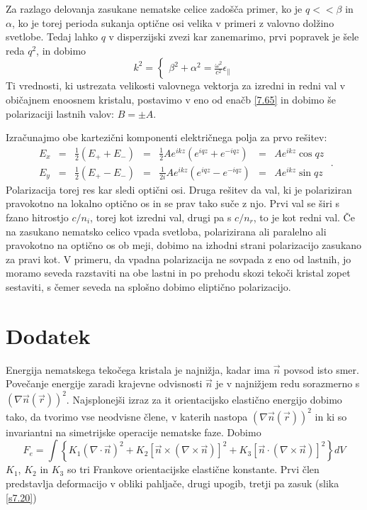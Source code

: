 \documentclass[11pt,fleqn]{book} %
\begin{document}
Za razlago delovanja zasukane nematske celice zadošča primer, ko je
$q<<\beta$ in $\alpha$, ko je torej perioda sukanja optične osi
velika v primeri z valovno dolžino svetlobe. Tedaj lahko $q$ v disperzijski
zvezi kar zanemarimo, prvi popravek je šele reda $q^{2}$, in dobimo
\begin{equation}
k^{2}=\left\{ \begin{matrix}\beta^{2}+\alpha^{2}=\frac{\omega^{2}}{c^{2}}\epsilon_{\parallel}\end{matrix}\right.\label{7.67}
\end{equation}
 Ti vrednosti, ki ustrezata velikosti valovnega vektorja za izredni
in redni val v običajnem enoosnem kristalu, postavimo v eno od enačb
\ref{7.65} in dobimo še polarizaciji lastnih valov: $B=\pm A$.

Izračunajmo obe kartezični komponenti električnega polja za prvo rešitev:
\begin{equation}
\begin{array}{lclclcl}
E_{x} & = & \frac{1}{2}(E_{+}+E_{-}) & = & \frac{1}{2}Ae^{ikz}(e^{iqz}+e^{-iqz}) & = & Ae^{ikz}\cos qz\\
E_{y} & = & \frac{1}{2}(E_{+}-E_{-}) & = & \frac{1}{2i}Ae^{ikz}(e^{iqz}-e^{-iqz}) & = & Ae^{ikz}\sin qz
\end{array}\;.\label{7.68}
\end{equation}
 Polarizacija torej res kar sledi optični osi. Druga rešitev da val,
ki je polariziran pravokotno na lokalno optično os in se prav tako
suče z njo. Prvi val se širi s fzano hitrostjo $c/n_{i}$, torej kot
izredni val, drugi pa s $c/n_{r}$, to je kot redni val. Če na zasukano
nematsko celico vpada svetloba, polarizirana ali paralelno ali pravokotno
na optično os ob meji, dobimo na izhodni strani polarizacijo zasukano
za pravi kot. V primeru, da vpadna polarizacija ne sovpada z eno od
lastnih, jo moramo seveda razstaviti na obe lastni in po prehodu skozi
tekoči kristal zopet sestaviti, s čemer seveda na splošno dobimo eliptično
polarizacijo.


\section{Dodatek}

Energija nematskega tekočega kristala je najnižja, kadar ima $\vec{n}$
povsod isto smer. Povečanje energije zaradi krajevne odvisnosti $\vec{n}$
je v najnižjem redu sorazmerno s $(\nabla\vec{n}(\vec{r}))^{2}$.
Najsplo\textquotedbl{}nejši izraz za {it orientacijsko elastično
energijo} dobimo tako, da tvorimo vse neodvisne člene, v katerih
nastopa $(\nabla\vec{n}(\vec{r}))^{2}$ in ki so invariantni na simetrijske
operacije nematske faze. Dobimo\cite{degennes} 
\begin{equation}
F_{e}=\int\left\{ K_{1}(\nabla\cdot\vec{n})^{2}+K_{2}[\vec{n}\times(\nabla\times\vec{n})]^{2}+K_{3}[\vec{n}\cdot(\nabla\times\vec{n})]^{2}\right\} dV\label{7.70}
\end{equation}
 $K_{1}$, $K_{2}$ in $K_{3}$ so tri Frankove orientacijske elastične
konstante. Prvi člen predstavlja deformacijo v obliki pahljače, drugi
upogib, tretji pa zasuk (slika \ref{s7.20})
\end{document}

